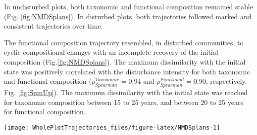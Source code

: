 \documentclass[fleqn,10pt]{ArtEcoFoG} %
\begin{document}
In undisturbed plots, both taxonomic and functional composition remained
stable (Fig. \ref{fig:NMDSplans}). In disturbed plots, both trajectories
followed marked and consistent trajectories over time.

The functional composition trajectory resembled, in disturbed
communities, to cyclic compositional changes with an incomplete recovery
of the initial composition (Fig.\ref{fig:NMDSplans}). The maximum
dissimilarity with the initial state was positively correlated with the
disturbance intensity for both taxonomic and functional composition
(\(\rho_{Spearman}^{Taxonomic}=0.94\) and
\(\rho_{Spearman}^{Functional}=0.90\), respectively. Fig.
\ref{fig:SumUp}). The maximum dissimilarity with the initial state was
reached for taxonomic composition between 15 to 25 years, and between 20
to 25 years for functional composition.

\begin{figure*}

{\centering \texttt{[image: WholePlotTrajectories\_files/figure-latex/NMDSplans-1]} 

}

\caption{Plot trajectories in terms of taxonomic composition (\textbf{(a)} and \textbf{(c)}), and functional composition (\textbf{(b)} and \textbf{(d)}) in a two-dimensional NMDS plane. Lower panels (\textbf{(c)} and \textbf{(d)}) represent the Euclidean distance to initial condition along the 30 sampled years. Shaded areas are the credibility intervals.}\label{fig:NMDSplans}
\end{figure*}
\end{document}
